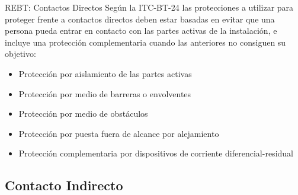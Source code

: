 \documentclass[xcolor={usenames,svgnames,dvipsnames}]{beamer}
\begin{document}
\begin{frame}[label=sec-2-2-4]{REBT: Contactos Directos}
Según la ITC-BT-24 las protecciones a utilizar para proteger frente a
contactos directos deben estar \alert{basadas en evitar que una persona pueda
entrar en contacto con las partes activas} de la instalación, e incluye
una protección complementaria cuando las anteriores no consiguen su
objetivo:

\begin{itemize}
\item Protección por \alert{aislamiento de las partes activas}

\item Protección por medio de \alert{barreras o envolventes}

\item Protección por medio de \alert{obstáculos}

\item Protección por puesta \alert{fuera de alcance} por alejamiento

\item Protección complementaria por \alert{dispositivos de corriente
diferencial}-residual
\end{itemize}
\end{frame}

\subsection{Contacto Indirecto}
\label{sec-2-3}
\end{document}
